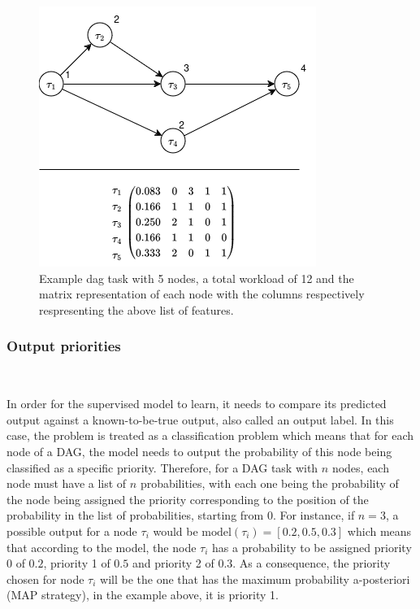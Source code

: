 \begin{figure}
    \centering
    \includegraphics[width=\linewidth]{images/dag_matrix_example.drawio.png}
    \caption{Example dag task with 5 nodes, a total workload of 12
    and the matrix representation of each node with the columns respectively respresenting the above list of features.}
    \label{fig:dag_task_matrix_example}
\end{figure}

\subsubsection{Output priorities}
~
\label{sec:output_labels}

In order for the supervised model to learn, it needs to 
compare its predicted output against a known-to-be-true output, also 
called an output label. In this case,
the problem is treated as a classification problem which means 
that for each node of a DAG, the model needs to output the probability
of this node being classified as a specific priority.
Therefore, for a DAG task with $n$ nodes,
each node must have a list of $n$ probabilities,
with each one being the probability of the node being 
assigned the priority corresponding to the position of the probability in the list
of probabilities, starting from 0.
For instance, if $n = 3$, 
a possible output for a node $\tau_i$ would be
$\text{model}(\tau_i) = [0.2,0.5,0.3]$ which means that according to the model,
the node $\tau_i$ has a probability to be assigned priority 0 of $0.2$,
priority 1 of $0.5$ and priority 2 of $0.3$.
As a consequence, the priority chosen for node $\tau_i$ will be 
the one that has the maximum probability a-posteriori (MAP strategy),
in the example above, it is priority 1.

